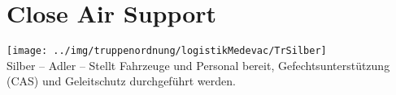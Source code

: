 \section{Close Air Support}
\texttt{[image: ../img/truppenordnung/logistikMedevac/TrSilber]}\\
Silber -- Adler -- Stellt Fahrzeuge und Personal bereit,  Gefechtsunterstützung (\ac{CAS}) und Geleitschutz durchgeführt werden.